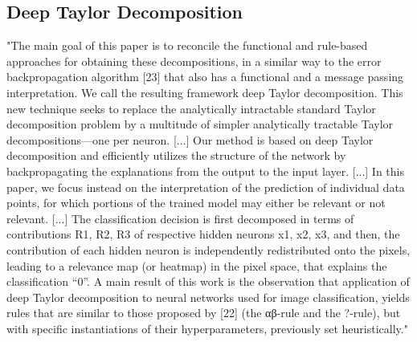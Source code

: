 \documentclass[]{scrartcl}
\begin{document}
\subsection{Deep Taylor Decomposition}
"The main goal of this paper is to reconcile the functional and rule-based approaches for obtaining these decompositions, in a similar way to the error backpropagation algorithm [23] that also has a functional and a message passing interpretation. We call the resulting framework deep Taylor decomposition. This new technique seeks to replace the analytically intractable standard Taylor decomposition problem by a multitude of simpler analytically tractable Taylor decompositions—one per neuron.
[...]
Our method is based on deep Taylor decomposition and efficiently utilizes the structure of the network by backpropagating the explanations from the output to the input layer.
[...]
In this paper, we focus instead on the interpretation of the prediction of individual data points, for which portions of the trained model may either be relevant or not relevant.
[...]
The classification decision is first decomposed in terms of contributions R1, R2, R3 of respective hidden neurons x1, x2, x3, and then, the contribution of each hidden neuron is independently redistributed onto the pixels, leading to a relevance map (or heatmap) in the pixel space, that explains the classification “0”.
A main result of this work is the observation that application
of deep Taylor decomposition to neural networks used for image classification, yields rules that are similar to those proposed by [22] (the αβ-rule and the ?-rule), but with specific instantiations of their hyperparameters, previously set heuristically." \cite{Montavon2017}
\end{document}
